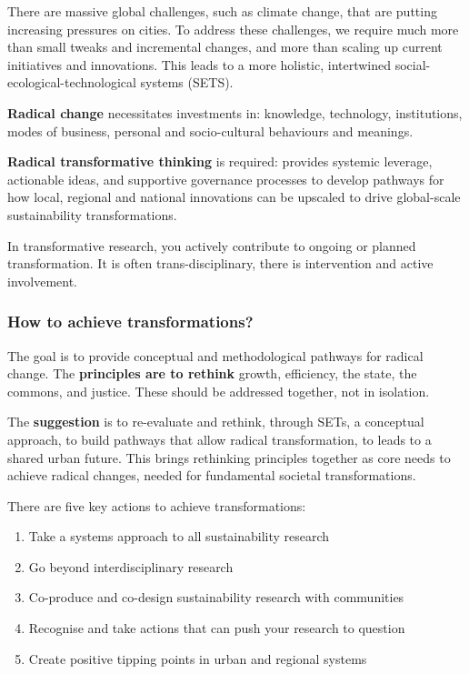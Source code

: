 \documentclass{article}
\begin{document}
There are massive global challenges, such as climate change, that are putting increasing pressures on cities. To address these challenges, we require much more than small tweaks and incremental changes, and more than scaling up current initiatives and innovations. 
This leads to a more holistic, intertwined social-ecological-technological systems (SETS).

\textbf{Radical change} necessitates investments in: knowledge, technology, institutions, modes of business, personal and socio-cultural behaviours and meanings.

\textbf{Radical transformative thinking} is required: provides systemic leverage, actionable ideas, and supportive governance processes to develop pathways for how local, regional and national innovations can be upscaled to drive global-scale sustainability transformations.

In transformative research, you actively contribute to ongoing or planned transformation. It is often trans-disciplinary, there is intervention and active involvement.

\subsubsection{How to achieve transformations?}

The goal is to provide conceptual and methodological pathways for radical change. 
The \textbf{principles are to rethink} growth, efficiency, the state, the commons, and justice. These should be addressed together, not in isolation.

The \textbf{suggestion} is to re-evaluate and rethink, through SETs, a conceptual approach, to build pathways that allow radical transformation, to leads to a shared urban future.
This brings rethinking principles together as core needs to achieve radical changes, needed for fundamental societal transformations.

There are five key actions to achieve transformations:

\begin{enumerate}
	\item Take a systems approach to all sustainability research
	\item Go beyond interdisciplinary research
	\item Co-produce and co-design sustainability research with communities
	\item Recognise and take actions that can push your research to question
	\item Create positive tipping points in urban and regional systems
\end{enumerate}
\end{document}
